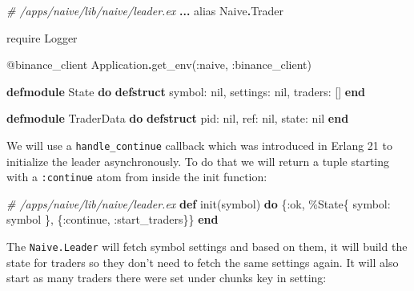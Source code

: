 \documentclass[
  oneside]{book}
\newenvironment{Shaded}{\begin{snugshade}}{\end{snugshade}}
\newcommand{\CommentTok}[1]{\textcolor[rgb]{0.56,0.35,0.01}{\textit{#1}}}
\newcommand{\ConstantTok}[1]{\textcolor[rgb]{0.00,0.00,0.00}{#1}}
\newcommand{\ImportTok}[1]{#1}
\newcommand{\KeywordTok}[1]{\textcolor[rgb]{0.13,0.29,0.53}{\textbf{#1}}}
\newcommand{\NormalTok}[1]{#1}
\newcommand{\OperatorTok}[1]{\textcolor[rgb]{0.81,0.36,0.00}{\textbf{#1}}}
\newcommand{\OtherTok}[1]{\textcolor[rgb]{0.56,0.35,0.01}{#1}}
\newcommand{\VariableTok}[1]{\textcolor[rgb]{0.00,0.00,0.00}{#1}}
\begin{document}
\begin{Shaded}
\begin{Highlighting}[]
\CommentTok{\# /apps/naive/lib/naive/leader.ex}
  \OperatorTok{...}
  \ImportTok{alias} \ConstantTok{Naive}\OperatorTok{.}\ConstantTok{Trader}

  \ImportTok{require} \ConstantTok{Logger}

  \OtherTok{@binance\_client} \ConstantTok{Application}\OperatorTok{.}\NormalTok{get\_env(}\VariableTok{:naive}\NormalTok{, }\VariableTok{:binance\_client}\NormalTok{)}

  \KeywordTok{defmodule} \ConstantTok{State} \KeywordTok{do}
    \KeywordTok{defstruct} \VariableTok{symbol:} \ConstantTok{nil}\NormalTok{,}
              \VariableTok{settings:} \ConstantTok{nil}\NormalTok{,}
              \VariableTok{traders:}\NormalTok{ []}
  \KeywordTok{end}

  \KeywordTok{defmodule} \ConstantTok{TraderData} \KeywordTok{do}
    \KeywordTok{defstruct} \VariableTok{pid:} \ConstantTok{nil}\NormalTok{,}
              \VariableTok{ref:} \ConstantTok{nil}\NormalTok{,}
              \VariableTok{state:} \ConstantTok{nil}
  \KeywordTok{end}
\end{Highlighting}
\end{Shaded}

We will use a \texttt{handle\_continue} callback which was introduced in Erlang 21 to
initialize the leader asynchronously. To do that we will return a tuple starting with a \texttt{:continue} atom from inside the init function:

\begin{Shaded}
\begin{Highlighting}[]
  \CommentTok{\# /apps/naive/lib/naive/leader.ex}
  \KeywordTok{def}\NormalTok{ init(symbol) }\KeywordTok{do}
\NormalTok{    \{}\VariableTok{:ok}\NormalTok{,}
\NormalTok{      \%}\ConstantTok{State}\NormalTok{\{}
          \VariableTok{symbol:}\NormalTok{ symbol}
\NormalTok{      \}, \{}\VariableTok{:continue}\NormalTok{, }\VariableTok{:start\_traders}\NormalTok{\}\}}
  \KeywordTok{end}
\end{Highlighting}
\end{Shaded}

The \texttt{Naive.Leader} will fetch symbol settings and based on them, it will build the state for traders so they don't need to fetch the same settings again. It will also start as many traders there were set under chunks key in setting:
\end{document}
